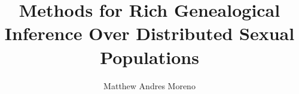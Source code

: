 \title{Methods for Rich Genealogical Inference Over Distributed Sexual Populations}

\author{Matthew Andres Moreno}
%
%
\maketitle
